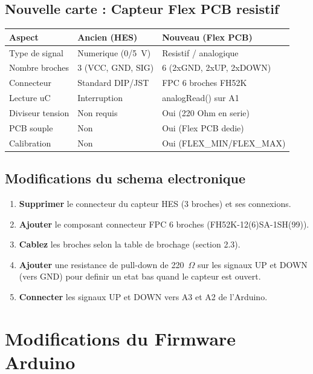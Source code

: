 \documentclass[12pt,a4paper]{article}
\begin{document}
\subsection{Nouvelle carte : Capteur Flex PCB resistif}

\begin{center}
\begin{tabular}{p{4cm}p{5cm}p{5cm}}
\toprule
\textbf{Aspect} & \textbf{Ancien (HES)} & \textbf{Nouveau (Flex PCB)} \\
\midrule
Type de signal  & Numerique (0/5~V)    & Resistif / analogique \\
Nombre broches  & 3 (VCC, GND, SIG)   & 6 (2xGND, 2xUP, 2xDOWN) \\
Connecteur      & Standard DIP/JST     & FPC 6 broches FH52K \\
Lecture uC      & Interruption         & analogRead() sur A1 \\
Diviseur tension & Non requis          & Oui (220 Ohm en serie) \\
PCB souple      & Non                  & Oui (Flex PCB dedie) \\
Calibration     & Non                  & Oui (FLEX\_MIN/FLEX\_MAX) \\
\bottomrule
\end{tabular}
\end{center}

\subsection{Modifications du schema electronique}

\begin{enumerate}
  \item \textbf{Supprimer} le connecteur du capteur HES (3 broches) et ses connexions.
  \item \textbf{Ajouter} le composant connecteur FPC 6 broches (FH52K-12(6)SA-1SH(99)).
  \item \textbf{Cablez} les broches selon la table de brochage (section 2.3).
  \item \textbf{Ajouter} une resistance de pull-down de 220~$\Omega$ sur les signaux
        UP et DOWN (vers GND) pour definir un etat bas quand le capteur est ouvert.
  \item \textbf{Connecter} les signaux UP et DOWN vers A3 et A2 de l'Arduino.
\end{enumerate}

\section{Modifications du Firmware Arduino}
\end{document}
